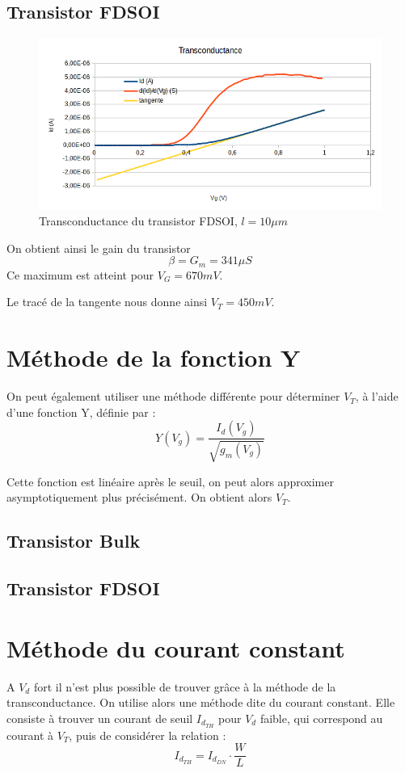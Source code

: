 \documentclass[a4paper,11pt]{report}
\begin{document}
\subsection{Transistor FDSOI}
\begin{figure}
    \begin{center}
        \includegraphics[width=\textwidth]{Images/FD1-10-Transconductance}
        \caption{Transconductance du transistor FDSOI, $l=10\mu m$}
        \label{fig:}
    \end{center}
\end{figure}
\noindent On obtient ainsi le gain du transistor \[\beta=G_m=341\mu S\] Ce maximum est atteint pour $V_G=670mV$.

Le tracé de la tangente nous donne ainsi $V_T=450mV$.

\section{Méthode de la fonction Y}
On peut également utiliser une méthode différente pour déterminer $V_T$, à l'aide d'une fonction Y, définie par :
\[Y(V_g)=\dfrac{I_d(V_g)}{\sqrt{g_m(V_g)}}\]

Cette fonction est linéaire après le seuil, on peut alors approximer asymptotiquement plus précisément. On obtient alors $V_T$.
\subsection{Transistor Bulk}
\subsection{Transistor FDSOI}
\section{Méthode du courant constant}
A $V_d$ fort il n'est plus possible de trouver grâce à la méthode de la transconductance. On utilise alors une méthode dite du courant constant. Elle consiste à trouver un courant de seuil $I_{d_{TH}}$ pour $V_d$ faible, qui correspond au courant à $V_T$, puis de considérer la relation : \[I_{d_{TH}}=I_{d_{DN}}\cdot\dfrac{W}{L}\]
\end{document}
